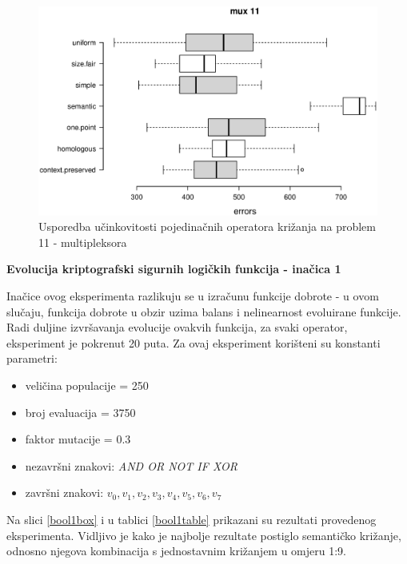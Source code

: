 \begin{figure}[H]
	\centering
	\includegraphics[trim=0cm 4cm 0cm 0cm, scale=0.6]{./slike/boxPlots/mux11.eps}
	\caption{Usporedba učinkovitosti pojedinačnih operatora križanja na problem 11 - multipleksora}
	\label{mux11box}
\end{figure}

\textbf{Evolucija kriptografski sigurnih logičkih funkcija - inačica 1}

Inačice ovog eksperimenta razlikuju se u izračunu funkcije dobrote - u ovom slučaju, funkcija dobrote u obzir uzima balans i nelinearnost evoluirane funkcije. Radi duljine izvršavanja evolucije ovakvih funkcija, za svaki operator, eksperiment je pokrenut 20 puta. Za ovaj eksperiment korišteni su konstanti parametri:
\begin{itemize}
\item{veličina populacije = 250}
\item{broj evaluacija = 3750}
\item{faktor mutacije = 0.3}
\item{nezavršni znakovi: \textit{AND OR NOT IF XOR}}
\item{završni znakovi: \textit{$v_0, v_1, v_2, v_3, v_4, v_5, v_6, v_7$}}
\end{itemize}

Na slici \ref{bool1box} i u tablici \ref{bool1table} prikazani su rezultati provedenog eksperimenta. Vidljivo je kako je najbolje rezultate postiglo semantičko križanje, odnosno njegova kombinacija s jednostavnim križanjem u omjeru 1:9.

